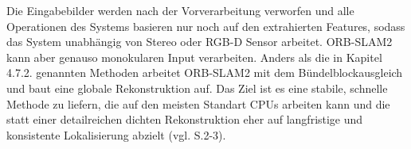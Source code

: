 Die Eingabebilder werden nach der Vorverarbeitung verworfen und alle Operationen des Systems basieren nur noch auf den extrahierten Features, sodass das System unabhängig von Stereo oder RGB-D Sensor arbeitet. ORB-SLAM2 kann aber genauso monokularen Input verarbeiten. Anders als die in Kapitel 4.7.2. genannten Methoden arbeitet ORB-SLAM2 mit dem Bündelblockausgleich und baut eine globale Rekonstruktion auf. Das Ziel ist es eine stabile, schnelle Methode zu liefern, die auf den meisten Standart CPUs arbeiten kann und die statt einer detailreichen dichten Rekonstruktion eher auf langfristige und konsistente Lokalisierung abzielt (vgl. \cite{orbslam2} S.2-3).


















